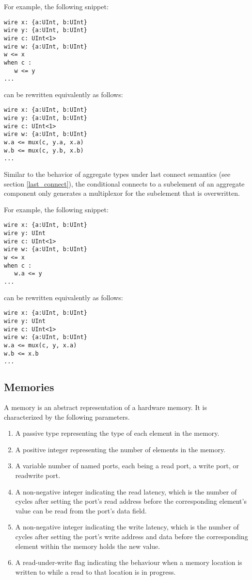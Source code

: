 \documentclass[12pt]{article}
\begin{document}
For example, the following snippet:
\begin{lstlisting}
wire x: {a:UInt, b:UInt}
wire y: {a:UInt, b:UInt}
wire c: UInt<1>
wire w: {a:UInt, b:UInt}
w <= x
when c :
   w <= y
...   
\end{lstlisting}
can be rewritten equivalently as follows:
\begin{lstlisting}
wire x: {a:UInt, b:UInt}
wire y: {a:UInt, b:UInt}
wire c: UInt<1>
wire w: {a:UInt, b:UInt}
w.a <= mux(c, y.a, x.a)
w.b <= mux(c, y.b, x.b)
...
\end{lstlisting}

Similar to the behavior of aggregate types under last connect semantics (see section \ref{last_connect}), the conditional connects to a subelement of an aggregate component only generates a multiplexor for the subelement that is overwritten.

For example, the following snippet:
\begin{lstlisting}
wire x: {a:UInt, b:UInt}
wire y: UInt
wire c: UInt<1>
wire w: {a:UInt, b:UInt}
w <= x
when c :
   w.a <= y
...   
\end{lstlisting}
can be rewritten equivalently as follows:
\begin{lstlisting}
wire x: {a:UInt, b:UInt}
wire y: UInt
wire c: UInt<1>
wire w: {a:UInt, b:UInt}
w.a <= mux(c, y, x.a)
w.b <= x.b
...
\end{lstlisting}

\subsection{Memories}
A memory is an abstract representation of a hardware memory. It is characterized by the following parameters.
\begin{enumerate}
\item A passive type representing the type of each element in the memory.
\item A positive integer representing the number of elements in the memory.
\item A variable number of named ports, each being a read port, a write port, or readwrite port.
\item A non-negative integer indicating the read latency, which is the number of cycles after setting the port's read address before the corresponding element's value can be read from the port's data field.
\item A non-negative integer indicating the write latency, which is the number of cycles after setting the port's write address and data before the corresponding element within the memory holds the new value.
\item A read-under-write flag indicating the behaviour when a memory location is written to while a read to that location is in progress.
\end{enumerate}
\end{document}
